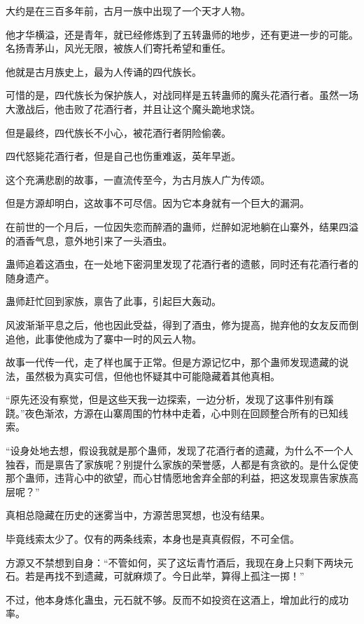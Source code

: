 
\begin{this_body}

大约是在三百多年前，古月一族中出现了一个天才人物。

他才华横溢，还是青年，就已经修炼到了五转蛊师的地步，还有更进一步的可能。名扬青茅山，风光无限，被族人们寄托希望和重任。

他就是古月族史上，最为人传诵的四代族长。

可惜的是，四代族长为保护族人，对战同样是五转蛊师的魔头花酒行者。虽然一场大激战后，他击败了花酒行者，并且让这个魔头跪地求饶。

但是最终，四代族长不小心，被花酒行者阴险偷袭。

四代怒毙花酒行者，但是自己也伤重难返，英年早逝。

这个充满悲剧的故事，一直流传至今，为古月族人广为传颂。

但是方源却明白，这故事不可尽信。因为它本身就有一个巨大的漏洞。

在前世的一个月后，一位因失恋而醉酒的蛊师，烂醉如泥地躺在山寨外，结果四溢的酒香气息，意外地引来了一头酒虫。

蛊师追着这酒虫，在一处地下密洞里发现了花酒行者的遗骸，同时还有花酒行者的随身遗产。

蛊师赶忙回到家族，禀告了此事，引起巨大轰动。

风波渐渐平息之后，他也因此受益，得到了酒虫，修为提高，抛弃他的女友反而倒追他，此事使他成为了寨中一时的风云人物。

故事一代传一代，走了样也属于正常。但是方源记忆中，那个蛊师发现遗藏的说法，虽然极为真实可信，但他也怀疑其中可能隐藏着其他真相。

“原先还没有察觉，但是这些天我一边探索，一边分析，发现了这事件别有蹊跷。”夜色渐浓，方源在山寨周围的竹林中走着，心中则在回顾整合所有的已知线索。

“设身处地去想，假设我就是那个蛊师，发现了花酒行者的遗藏，为什么不一个人独吞，而是禀告了家族呢？别提什么家族的荣誉感，人都是有贪欲的。是什么促使那个蛊师，违背心中的欲望，而心甘情愿地舍弃全部的利益，把这发现禀告家族高层呢？”

真相总隐藏在历史的迷雾当中，方源苦思冥想，也没有结果。

毕竟线索太少了。仅有的两条线索，本身也是真真假假，不可全信。

方源又不禁想到自身：“不管如何，买了这坛青竹酒后，我现在身上只剩下两块元石。若是再找不到遗藏，可就麻烦了。今日此举，算得上孤注一掷！”

不过，他本身炼化蛊虫，元石就不够。反而不如投资在这酒上，增加此行的成功率。


\end{this_body}

